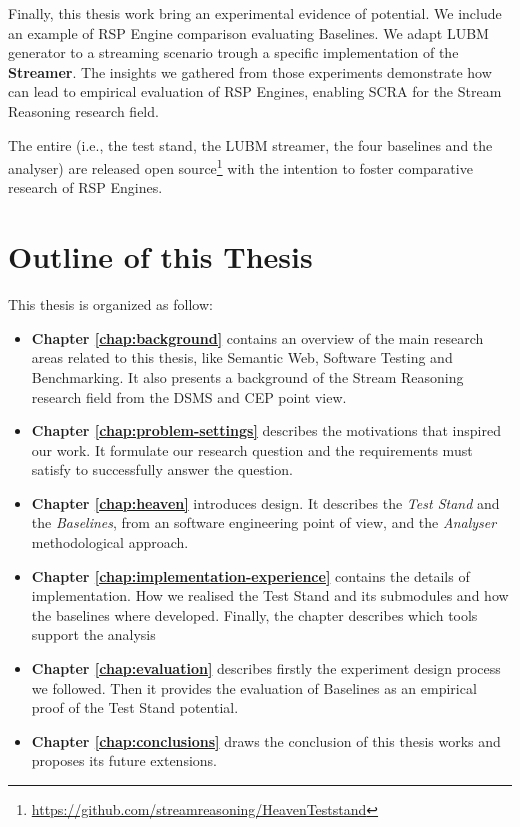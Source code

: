 Finally, this thesis work bring an experimental evidence of \name potential. We include an example of RSP Engine comparison evaluating \name Baselines. We adapt LUBM generator to a streaming scenario trough a specific implementation of the \textbf{Streamer}. The insights we gathered from those experiments demonstrate how \name can lead to empirical evaluation of RSP Engines, enabling SCRA for the Stream Reasoning research field.

The entire \name (i.e., the test stand, the LUBM streamer, the four baselines and the analyser) are released open source\footnote{\url{https://github.com/streamreasoning/HeavenTeststand}} with the intention to foster comparative research of RSP Engines.

\section{Outline of this Thesis}\label{sec:thesis-structure-intro}

This thesis is organized as follow:

\begin{itemize}

\item \textbf{Chapter \ref{chap:background}} contains an overview of the main research areas related to this thesis, like Semantic Web, Software Testing and Benchmarking. It also presents a background of the Stream Reasoning research field from the DSMS and CEP point view.
\item \textbf{Chapter \ref{chap:problem-settings}} describes the motivations that inspired our work. It formulate our research question and the requirements \name must satisfy to successfully answer the question.
\item \textbf{Chapter \ref{chap:heaven}} introduces \name design. It describes the \textit{Test Stand} and the \textit{Baselines}, from an software engineering point of view, and the \textit{Analyser} methodological approach.
\item \textbf{Chapter \ref{chap:implementation-experience}} contains the details of \name implementation. How we realised the Test Stand and its submodules and how the baselines where developed. Finally, the chapter describes which tools support the analysis %
\item \textbf{Chapter \ref{chap:evaluation}} describes firstly the experiment design process we followed. Then it provides the evaluation of \name Baselines as an empirical proof of the Test Stand potential.
\item \textbf{Chapter \ref{chap:conclusions}} draws the conclusion of this thesis works and proposes its future extensions.
\end{itemize}